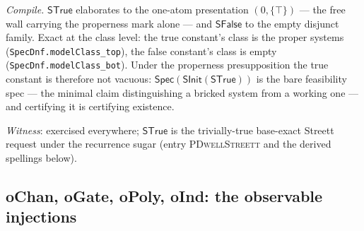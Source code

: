 \emph{Compile.} $\mathsf{STrue}$ elaborates to the one-atom
presentation $(0, \{\top\})$ --- the free wall carrying the
properness mark alone --- and $\mathsf{SFalse}$ to the empty
disjunct family. Exact at the class level: the true constant's class
is the proper systems (\texttt{SpecDnf.modelClass\_top}), the false
constant's class is empty (\texttt{SpecDnf.modelClass\_bot}). Under
the properness presupposition the true constant is therefore not
vacuous: $\mathsf{Spec}(\mathsf{SInit}(\mathsf{STrue}))$ is the bare
feasibility
spec --- the minimal claim distinguishing a bricked system from a
working one --- and certifying it is certifying existence.

\emph{Witness}: exercised everywhere; $\mathsf{STrue}$ is the
trivially-true base-exact Streett request under the recurrence sugar
(entry \textsc{PDwellStreett} and the derived spellings below).



\subsection{oChan, oGate, oPoly, oInd: the observable injections}
\label{sec:spec-lang-obs}


